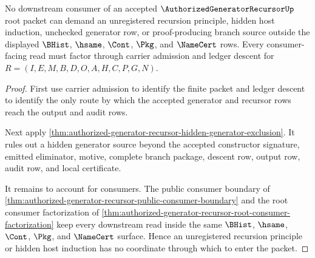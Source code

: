 \begin{theorem}
\label{thm:authorized-generator-recursor-consumer-nonescape}
No downstream consumer of an accepted $\AuthorizedGeneratorRecursorUp$ root packet can demand an unregistered recursion principle, hidden host induction, unchecked generator row, or proof-producing branch source outside the displayed $\BHist$, $\hsame$, $\Cont$, $\Pkg$, and $\NameCert$ rows. Every consumer-facing read must factor through carrier admission and ledger descent for $R=(I,E,M,B,D,O,A,H,C,P,G,N)$.
\end{theorem}
\begin{proof}
First use carrier admission to identify the finite packet and ledger descent to identify the only route by which the accepted generator and recursor rows reach the output and audit rows.

Next apply \autoref{thm:authorized-generator-recursor-hidden-generator-exclusion}. It rules out a hidden generator source beyond the accepted constructor signature, emitted eliminator, motive, complete branch package, descent row, output row, audit row, and local certificate.

It remains to account for consumers. The public consumer boundary of \autoref{thm:authorized-generator-recursor-public-consumer-boundary} and the root consumer factorization of \autoref{thm:authorized-generator-recursor-root-consumer-factorization} keep every downstream read inside the same $\BHist$, $\hsame$, $\Cont$, $\Pkg$, and $\NameCert$ surface. Hence an unregistered recursion principle or hidden host induction has no coordinate through which to enter the packet.
\end{proof}

